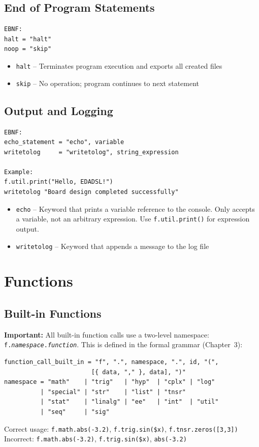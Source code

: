 \section{End of Program Statements}
\begin{verbatim}
EBNF:
halt = "halt"
noop = "skip"
\end{verbatim}
\begin{itemize}
\item \texttt{halt} -- Terminates program execution and exports all created files
\item \texttt{skip} -- No operation; program continues to next statement
\end{itemize}

\section{Output and Logging}
\begin{verbatim}
EBNF:
echo_statement = "echo", variable
writetolog     = "writetolog", string_expression

Example:
f.util.print("Hello, EDADSL!")
writetolog "Board design completed successfully"
\end{verbatim}
\begin{itemize}
\item \texttt{echo} -- Keyword that prints a variable reference to the console. Only accepts a variable, not an arbitrary expression. Use \texttt{f.util.print()} for expression output.
\item \texttt{writetolog} -- Keyword that appends a message to the log file
\end{itemize}




\chapter{Functions}
\section{Built-in Functions}

\textbf{Important:} All built-in function calls use a two-level namespace: \texttt{f.\textit{namespace}.\textit{function}}. This is defined in the formal grammar (Chapter~3):
\begin{verbatim}
function_call_built_in = "f", ".", namespace, ".", id, "(",
                        [{ data, "," }, data], ")"
namespace = "math"    | "trig"   | "hyp"  | "cplx" | "log"
          | "special" | "str"    | "list" | "tnsr"
          | "stat"    | "linalg" | "ee"   | "int"  | "util"
          | "seq"     | "sig"
\end{verbatim}
Correct usage: \texttt{f.math.abs(-3.2)}, \texttt{f.trig.sin(\$x)}, \texttt{f.tnsr.zeros([3,3])}\\
Incorrect: \texttt{f.math.abs(-3.2)}, \texttt{f.trig.sin(\$x)}, \texttt{abs(-3.2)}

